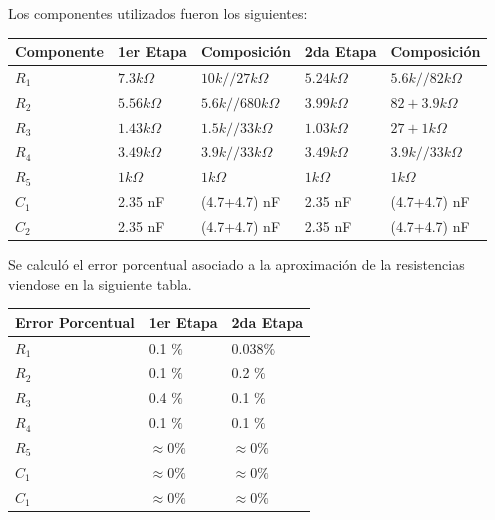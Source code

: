 Los componentes utilizados fueron los siguientes:
\begin{table}[H]
\centering
\begin{tabular}{lllll}
\multicolumn{1}{c}{Componente} & \multicolumn{1}{c}{1er Etapa} & \multicolumn{1}{c}{Composición} & 2da Etapa      & Composición           \\ \hline
$R_1$                          & $7.3 k\Omega$                 & $10k // 27k  \Omega$            & $5.24 k\Omega$ & $5.6k // 82k  \Omega$ \\
$R_2$                          & $5.56 k\Omega$                & $5.6k // 680k  \Omega$          & $3.99 k\Omega$ & $82 + 3.9k  \Omega$   \\
$R_3$                          & $1.43 k\Omega$                & $1.5 k // 33k  \Omega$          & $1.03k\Omega$  & $27 + 1k  \Omega$     \\
$R_4$                          & $3.49 k\Omega$                & $3.9k // 33k  \Omega$           & $3.49 k\Omega$ & $3.9k // 33k  \Omega$ \\
$R_5$                          & $1 k\Omega$                   & $1 k  \Omega$                   & $1 k\Omega$    & $1 k\Omega$           \\
$C_1$                          & 2.35 nF         & (4.7+4.7) nF                          & 2.35 nF         & (4.7+4.7) nF                \\
$C_2$                          & 2.35 nF         & (4.7+4.7) nF                          & 2.35 nF         & (4.7+4.7) nF               
\end{tabular}
\end{table}

Se calculó el error porcentual asociado a la aproximación de la resistencias viendose en la siguiente tabla.
\begin{table}[H]
\centering
\begin{tabular}{lll}
\multicolumn{1}{c}{Error Porcentual} & \multicolumn{1}{c}{1er Etapa} & \multicolumn{1}{c}{2da Etapa} \\ \hline
$R_1$                                & 0.1 $\%$                      & $0.038  \%$                   \\
$R_2$                                & 0.1 $\%$                      & 0.2 $\%$                      \\
$R_3$                                & 0.4 $\%$                      & 0.1 $\%$                      \\
$R_4$                                & 0.1 $\%$                      & 0.1 $\%$                      \\
$R_5$                                & $\approx 0 \%$                & $\approx 0 \%$                \\
$C_1$                                & $\approx 0 \%$                & $\approx 0 \%$                \\
$C_1$                                & $\approx 0 \%$                & $\approx 0 \%$               
\end{tabular}
\end{table}

